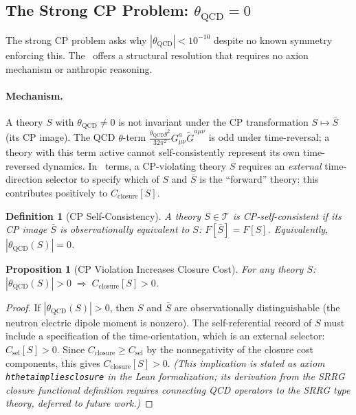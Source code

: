 \documentclass[11pt]{article}
\newtheorem{proposition}[theorem]{Proposition}
\newtheorem{definition}[theorem]{Definition}
\theoremstyle{remark}
\newcommand{\SRRG}{\text{SRRG}}
\newcommand{\lean}[1]{%
  \penalty-100
  \begingroup
  \def\_{\textunderscore\allowbreak}%
  \texttt{#1}%
  \endgroup
}
\begin{document}
\begin{appendices}
\subsection{The Strong CP Problem: $\theta_{\mathrm{QCD}} = 0$}
\label{app:strong_cp}

The strong CP problem asks why $|\theta_{\mathrm{QCD}}| < 10^{-10}$ despite no
known symmetry enforcing this.  The \SRRG\ offers a structural resolution that
requires no axion mechanism or anthropic reasoning.

\paragraph{Mechanism.}
A theory $S$ with $\theta_{\mathrm{QCD}} \neq 0$ is not invariant under the CP
transformation $S \mapsto \bar{S}$ (its CP image).  The QCD $\theta$-term
$\frac{\theta_{\mathrm{QCD}} g^2}{32\pi^2} G^a_{\mu\nu} \tilde{G}^{a\mu\nu}$
is odd under time-reversal; a theory with this term active cannot self-consistently
represent its own time-reversed dynamics.  In \SRRG\ terms, a CP-violating theory $S$
requires an \emph{external} time-direction selector to specify which of $S$ and
$\bar{S}$ is the ``forward'' theory: this contributes positively to $C_{\mathrm{closure}}[S]$.

\begin{definition}[CP Self-Consistency]
A theory $S \in \mathcal{T}$ is \emph{CP-self-consistent} if its CP image
$\bar{S}$ is observationally equivalent to $S$: $F[\bar{S}] = F[S]$.  Equivalently,
$|\theta_{\mathrm{QCD}}(S)| = 0$.
\end{definition}

\begin{proposition}[CP Violation Increases Closure Cost]
\label{prop:cp_closure_app}
For any theory $S$: $|\theta_{\mathrm{QCD}}(S)| > 0 \;\Rightarrow\; C_{\mathrm{closure}}[S] > 0$.
\end{proposition}

\begin{proof}
If $|\theta_{\mathrm{QCD}}(S)| > 0$, then $S$ and $\bar{S}$ are observationally
distinguishable (the neutron electric dipole moment is nonzero).  The self-referential
record of $S$ must include a specification of the time-orientation, which is an
external selector: $C_{\mathrm{sel}}[S] > 0$.  Since $C_{\mathrm{closure}} \geq C_{\mathrm{sel}}$
by the nonnegativity of the closure cost components, this gives $C_{\mathrm{closure}}[S] > 0$.
\textit{(This implication is stated as axiom \lean{h\_theta\_implies\_closure} in the
Lean formalization; its derivation from the SRRG closure functional definition requires
connecting QCD operators to the SRRG type theory, deferred to future work.)}
\end{proof}


\end{appendices}
\end{document}
